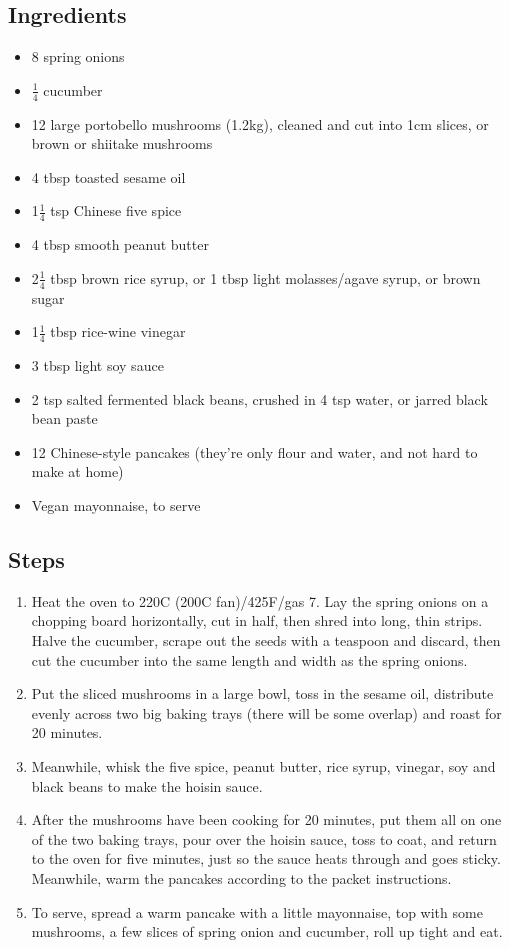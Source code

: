 \documentclass{book}
\begin{document}
\subsection*{Ingredients}
\begin{itemize}
\item 8 spring onions
\item $\frac{1}{4}$ cucumber
\item 12 large portobello mushrooms (1.2kg), cleaned and cut into 1cm slices, or brown or shiitake mushrooms
\item 4 tbsp toasted sesame oil
\item 1$\frac{1}{4}$ tsp Chinese five spice
\item 4 tbsp smooth peanut butter
\item 2$\frac{1}{4}$ tbsp brown rice syrup, or 1 tbsp light molasses/agave syrup, or brown sugar
\item 1$\frac{1}{4}$ tbsp rice-wine vinegar
\item 3 tbsp light soy sauce
\item 2 tsp salted fermented black beans, crushed in 4 tsp water, or jarred black bean paste
\item 12 Chinese-style pancakes (they’re only flour and water, and not hard to make at home)
\item Vegan mayonnaise, to serve
\end{itemize}

\subsection*{Steps}
\begin{enumerate}
\item Heat the oven to 220C (200C fan)/425F/gas 7. Lay the spring onions on a chopping board horizontally, cut in half, then shred into long, thin strips. Halve the cucumber, scrape out the seeds with a teaspoon and discard, then cut the cucumber into the same length and width as the spring onions.
\item Put the sliced mushrooms in a large bowl, toss in the sesame oil, distribute evenly across two big baking trays (there will be some overlap) and roast for 20 minutes.
\item Meanwhile, whisk the five spice, peanut butter, rice syrup, vinegar, soy and black beans to make the hoisin sauce.
\item After the mushrooms have been cooking for 20 minutes, put them all on one of the two baking trays, pour over the hoisin sauce, toss to coat, and return to the oven for five minutes, just so the sauce heats through and goes sticky. Meanwhile, warm the pancakes according to the packet instructions.
\item To serve, spread a warm pancake with a little mayonnaise, top with some mushrooms, a few slices of spring onion and cucumber, roll up tight and eat.
\end{enumerate}
\newpage
\end{document}
